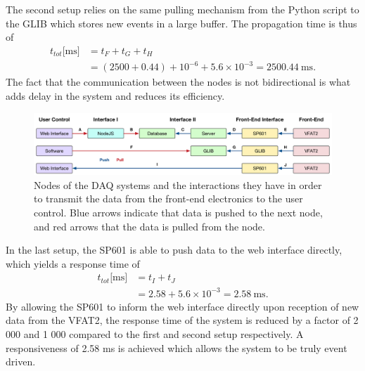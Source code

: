       The second setup relies on the same pulling mechanism from the Python script to the GLIB which stores new events in a large buffer. The propagation time is thus of
      \begin{equation}
        \begin{split}
          t_{tot}\text{[ms]} & = t_F + t_G + t_H \\
                             & = (2500 + 0.44) + 10^{-6} + 5.6 \times 10^{-3} = 2500.44 \ \text{ms}.
        \end{split}
      \end{equation}
      The fact that the communication between the nodes is not bidirectional is what adds delay in the system and reduces its efficiency. \\

      \begin{figure}[t!]
        \centering
        \includegraphics[width=\textwidth]{img/III-2-web-daq/data_req}
        \caption{Nodes of the DAQ systems and the interactions they have in order to transmit the data from the front-end electronics to the user control. Blue arrows indicate that data is pushed to the next node, and red arrows that the data is pulled from the node.}
        \label{fig:III-2-data-req}
      \end{figure}

      In the last setup, the SP601 is able to push data to the web interface directly, which yields a response time of
      \begin{equation}
        \begin{split}
          t_{tot}\text{[ms]} & = t_I + t_J \\
                             & = 2.58 + 5.6 \times 10^{-3} = 2.58 \ \text{ms}.
        \end{split}
      \end{equation}
      By allowing the SP601 to inform the web interface directly upon reception of new data from the VFAT2, the response time of the system is reduced by a factor of 2 000 and 1 000 compared to the first and second setup respectively. A responsiveness of 2.58 ms is achieved which allows the system to be truly event driven.


